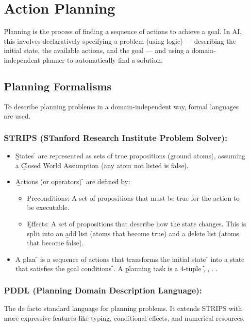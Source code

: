 \section{Action Planning}
Planning is the process of finding a sequence of actions to achieve a goal. In AI, this involves declaratively specifying a problem (using logic) — describing the initial state, the available actions, and the goal — and using a domain-independent planner to automatically find a solution.

\subsection{Planning Formalisms}
To describe planning problems in a domain-independent way, formal languages are used.
\subsubsection{STRIPS (STanford Research Institute Problem Solver):}
\begin{itemize}
    \item \b{States} \f{} are represented as sets of true propositions (ground atoms), assuming a \b{Closed World Assumption} (any atom not listed is false).
    \item \b{Actions} (or operators) \f{ } are defined by:
    \begin{itemize}
        \item \b{Preconditions:} A set of propositions that must be true for the action to be executable.
        \item \b{Effects:} A set of propositions that describe how the state changes. This is split into an \b{add list} (atoms that become true) and a \b{delete list} (atoms that become false).
    \end{itemize}
    \item A \b{plan} \f{\Delta} is a sequence of actions that transforms the initial state \f{ } into a state that satisfies the goal conditions \f{}. A \b{planning task} is a 4-tuple \f{\left\langle {}, , . \right\rangle }.
\end{itemize}

\subsubsection{PDDL (Planning Domain Description Language):}
The de facto standard language for planning problems. It extends STRIPS with more expressive features like typing, conditional effects, and numerical resources.

